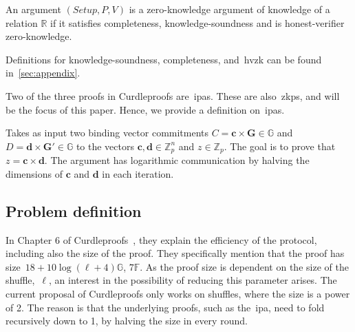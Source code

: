 \begin{definition}
    An argument $(Setup, P, V)$ is a zero-knowledge argument of knowledge of a relation $\mathbb{R}$ if it satisfies completeness, knowledge-soundness and is honest-verifier zero-knowledge.
\end{definition}

Definitions for knowledge-soundness, completeness, and~\gls{hvzk} can be found in~\autoref{sec:appendix}.

Two of the three proofs in Curdleproofs are~\glspl{ipa}.
These are also~\glspl{zkp}, and will be the focus of this paper.
Hence, we provide a definition on~\glspl{ipa}.

\begin{definition}
    Takes as input two binding vector commitments $C=\mathbf{c}\times\mathbf{G}\in\mathbb{G}$ and $D=\mathbf{d}\times\mathbf{G'}\in\mathbb{G}$ to the vectors $\mathbf{c},\mathbf{d}\in\mathbb{Z}_p^n$ and $z\in\mathbb{Z}_p$.
    The goal is to prove that $z=\mathbf{c}\times\mathbf{d}$.
    The argument has logarithmic communication by halving the dimensions of $\mathbf{c}$ and $\mathbf{d}$ in each iteration.
\end{definition}

\subsection{Problem definition}\label{subsec:problem-definition}
In Chapter 6 of Curdleproofs~\cite{Curdleproofs}, they explain the efficiency of the protocol, including also the size of the proof.
They specifically mention that the proof has size~$18+10 \log(\ell+4)\mathbb{G}$, $7\mathbb{F}$.
As the proof size is dependent on the size of the shuffle,~$\ell$, an interest in the possibility of reducing this parameter arises.
The current proposal of Curdleproofs only works on shuffles, where the size is a power of 2.
The reason is that the underlying proofs, such as the~\gls{ipa}, need to fold recursively down to 1, by halving the size in every round.

